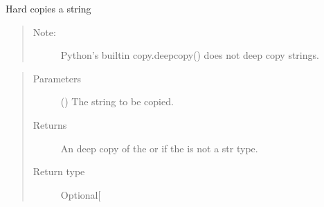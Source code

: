 \documentclass[letterpaper,10pt,english]{sphinxmanual}
\begin{document}

\begin{fulllineitems}
\label{\detokenize{app.utils:app.utils.convertions.str_copy}}
Hard copies a string
\begin{quote}
\begin{description}
\item[{Note:}] \leavevmode
Python’s builtin copy.deepcopy() does not deep copy strings.

\end{description}
\end{quote}
\begin{quote}\begin{description}
\item[{Parameters}] \leavevmode
{} () \textendash{} The string to be copied.

\item[{Returns}] \leavevmode
An deep copy of the  or  if the 
is not a str type.

\item[{Return type}] \leavevmode
Optional{[}\sphinxhref{https://docs.python.org/3.7/library/stdtypes.html\#str}{str}{]}

\end{description}\end{quote}

\end{fulllineitems}

\end{document}
